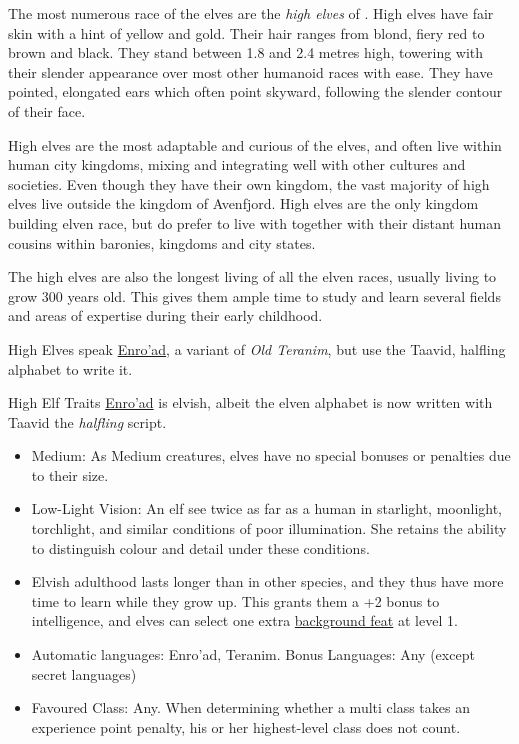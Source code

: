 The most numerous race of the elves are the \emph{high elves} of
. High elves have fair skin with a hint of yellow and
gold. Their hair ranges from blond, fiery red to brown and black. They stand
between 1.8 and 2.4 metres high, towering with their slender appearance over
most other humanoid races with ease. They have pointed, elongated ears which
often point skyward, following the slender contour of their face.

High elves are the most adaptable and curious of the elves, and often live
within human city kingdoms, mixing and integrating well with other cultures
and societies. Even though they have their own kingdom, the vast majority of
high elves live outside the kingdom of Avenfjord. High elves are the only
kingdom building elven race, but do prefer to live with together with their
distant human cousins within baronies, kingdoms and city states.

The high elves are also the longest living of all the elven races, usually
living to grow 300 years old. This gives them ample time to study and learn
several fields and areas of expertise during their early childhood.

High Elves speak \hyperref[sec:Speak Language]{Enro'ad}, a variant of
\emph{Old Teranim}, but use the Taavid, halfling alphabet to write it.

\begin{35e}{High Elf Traits}
  \hyperref[sec:Speak Language]{Enro'ad} is elvish, albeit the elven alphabet
  is now written with Taavid the \emph{halfling} script.

  \begin{itemize}[noitemsep]
    \item Medium: As Medium creatures, elves have no special bonuses or
    penalties due to their size.
    \item Low-Light Vision: An elf see twice as far as a human in starlight,
    moonlight, torchlight, and similar conditions of poor illumination. She
    retains the ability to distinguish colour and detail under these
    conditions.
    \item Elvish adulthood lasts longer than in other species, and they thus
      have more time to learn while they grow up. This grants them a +2 bonus
      to intelligence, and elves can select one extra
      \hyperref[sec:Background Feats]{background feat} at level 1.
    \item Automatic languages: Enro'ad, Teranim. Bonus Languages: Any (except
      secret languages)
    \item Favoured Class: Any. When determining whether a multi class takes an
    experience point penalty, his or her highest-level class does not count.
  \end{itemize}
\end{35e}

